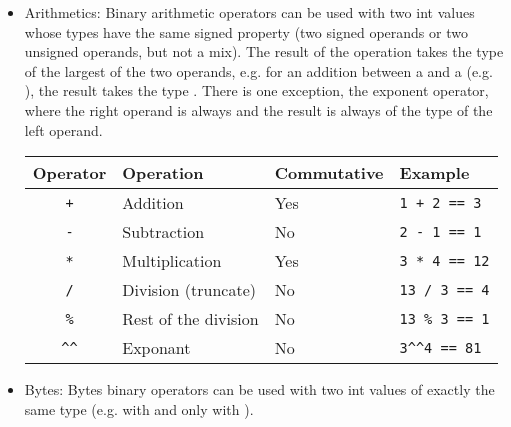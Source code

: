 \begin{itemize}
\item Arithmetics: Binary arithmetic operators can be used with two int values
  whose types have the same signed property (two signed operands or two unsigned
  operands, but not a mix). The result of the operation takes the type of the
  largest of the two operands, e.g. for an addition between a  and a
   (e.g. ), the result takes the type
  . There is one exception, the exponent operator, where the right
  operand is always  and the result is always of the type of the
  left operand.

  \begin{center}
    \vspace{-10pt}
    \begin{adjustbox}{max width=1.0\linewidth}
      \begin{tabular}{|c|lll|}
        \hline
        Operator & Operation & Commutative & Example\\[0pt]
        \hline
        \hline
        \texttt{+} & Addition & Yes & \texttt{1 + 2 == 3}\\[0pt]
        \texttt{-} & Subtraction & No & \texttt{2 - 1 == 1}\\[0pt]
        \texttt{*} & Multiplication & Yes & \texttt{3 * 4 == 12}\\[0pt]
        \texttt{/} & Division (truncate) & No & \texttt{13 / 3 == 4}\\[0pt]
        \texttt{\%} & Rest of the division & No & \texttt{13 \% 3 == 1}\\[0pt]
        \texttt{\textasciicircum{}\textasciicircum{}} & Exponant & No & \texttt{3\textasciicircum{}\textasciicircum{}4 == 81}\\[0pt]
        \hline
      \end{tabular}
    \end{adjustbox}
  \end{center}

\item Bytes: Bytes binary operators can be used with two int values of exactly
  the same type (e.g.  with and only with ).


\end{itemize}
